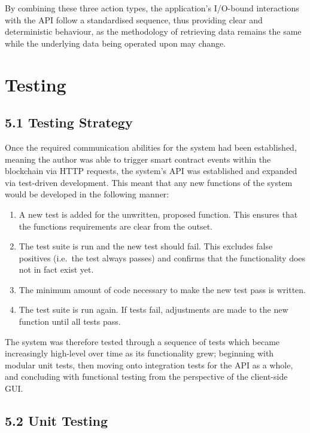 By combining these three action types, the application's I/O-bound
interactions with the API follow a standardised sequence, thus providing
clear and deterministic behaviour, as the methodology of retrieving data
remains the same while the underlying data being operated upon may
change.

\chapter{Testing}

\section{5.1 Testing Strategy}\label{testing-strategy}

Once the required communication abilities for the system had been
established, meaning the author was able to trigger smart contract
events within the blockchain via HTTP requests, the system's API was
established and expanded via test-driven development. This meant that
any new functions of the system would be developed in the following
manner\cite{beck2003test}:

\begin{enumerate}
\def\labelenumi{\arabic{enumi}.}
\tightlist
\item
  A new test is added for the unwritten, proposed function. This ensures
  that the functions requirements are clear from the outset.
\item
  The test suite is run and the new test should fail. This excludes
  false positives (i.e.~the test always passes) and confirms that the
  functionality does not in fact exist yet.
\item
  The minimum amount of code necessary to make the new test pass is
  written.
\item
  The test suite is run again. If tests fail, adjustments are made to
  the new function until all tests pass.
\end{enumerate}

The system was therefore tested through a sequence of tests which became
increasingly high-level over time as its functionality grew; beginning
with modular unit tests, then moving onto integration tests for the API
as a whole, and concluding with functional testing from the perspective
of the client-side GUI.

\section{5.2 Unit Testing}\label{unit-testing}

